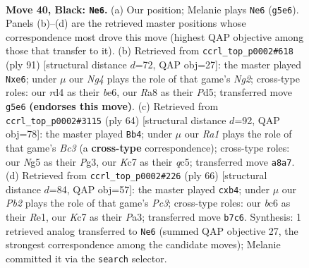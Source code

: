 \documentclass[11pt]{article}
\begin{document}
\clearpage

\begin{figure}[p]\centering
\begin{subfigure}{0.46\textwidth}\centering
\resizebox{\linewidth}{!}{%
\newchessgame
\chessboard[
  setfen={r7/1pk3p1/p1B2pN1/2Q3n1/3R3p/4P1P1/PPR2P1P/7K b - - 0 40},
  showmover=false,
  pgfstyle=straightmove, color=movearrow, markmove={g5-e6}
]}
\caption{}
\end{subfigure}\hfill
\begin{subfigure}{0.46\textwidth}\centering
\resizebox{\linewidth}{!}{%
\newchessgame
\chessboard[
  setfen={6k1/1p4np/2p1BQp1/2Pp2R1/1P3P2/P3P1K1/8/5q1r b - - 4 46},
  showmover=false,
  pgfstyle=straightmove, color=movearrow, markmove={g7-e6}
]}
\caption{}
\end{subfigure}
\\[4pt]
\begin{subfigure}{0.46\textwidth}\centering
\resizebox{\linewidth}{!}{%
\newchessgame
\chessboard[
  setfen={3N2k1/1p2pr1p/6p1/2qb4/p1B5/1PB1P1PP/P4P2/2R3K1 w - - 0 33},
  showmover=false,
  pgfstyle=straightmove, color=movearrow, markmove={c3-b4}
]}
\caption{}
\end{subfigure}\hfill
\begin{subfigure}{0.46\textwidth}\centering
\resizebox{\linewidth}{!}{%
\newchessgame
\chessboard[
  setfen={6k1/pN2rp1p/1p4p1/6P1/1q1p3P/P1P1nP1B/1P6/1K2R3 w - - 0 34},
  showmover=false,
  pgfstyle=straightmove, color=movearrow, markmove={c3-b4}
]}
\caption{}
\end{subfigure}
\caption{\textbf{Move 40, Black: \texttt{Ne6}.} (a) Our position; Melanie plays \texttt{Ne6} (\texttt{g5e6}). Panels (b)--(d) are the retrieved master positions whose correspondence most drove this move (highest QAP objective among those that transfer to it). (b) Retrieved from \texttt{ccrl\_top\_p0002\#618} (ply 91) [structural distance $d$=72, QAP obj=27]: the master played \texttt{Nxe6}; under $\mu$ our \emph{Ng4} plays the role of that game's \emph{Ng2}; cross-type roles: our \emph{r}d4 as their \emph{b}e6, our \emph{R}a8 as their \emph{P}d5; transferred move \texttt{g5e6} \textbf{(endorses this move)}. (c) Retrieved from \texttt{ccrl\_top\_p0002\#3115} (ply 64) [structural distance $d$=92, QAP obj=78]: the master played \texttt{Bb4}; under $\mu$ our \emph{Ra1} plays the role of that game's \emph{Bc3} (a \textbf{cross-type} correspondence); cross-type roles: our \emph{N}g5 as their \emph{P}g3, our \emph{K}c7 as their \emph{q}c5; transferred move \texttt{a8a7}. (d) Retrieved from \texttt{ccrl\_top\_p0002\#226} (ply 66) [structural distance $d$=84, QAP obj=57]: the master played \texttt{cxb4}; under $\mu$ our \emph{Pb2} plays the role of that game's \emph{Pc3}; cross-type roles: our \emph{b}c6 as their \emph{R}e1, our \emph{K}c7 as their \emph{P}a3; transferred move \texttt{b7c6}. Synthesis: 1 retrieved analog transferred to \texttt{Ne6} (summed QAP objective 27, the strongest correspondence among the candidate moves); Melanie committed it via the \texttt{search} selector.}
\label{fig:thought-m79}
\end{figure}
\end{document}
